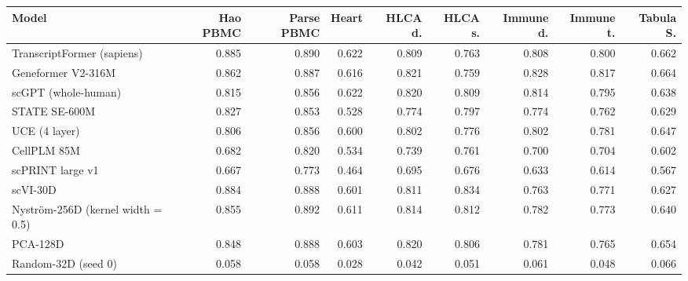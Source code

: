 \begin{tabular}{@{}lrrrrrrrr@{}}
\toprule
Model & Hao PBMC & Parse PBMC & Heart & HLCA d. & HLCA s. & Immune d. & Immune t. & Tabula S. \\
\midrule
TranscriptFormer (sapiens) & 0.885 & 0.890 & 0.622 & 0.809 & 0.763 & 0.808 & 0.800 & 0.662 \\
Geneformer V2-316M & 0.862 & 0.887 & 0.616 & 0.821 & 0.759 & 0.828 & 0.817 & 0.664 \\
scGPT (whole-human) & 0.815 & 0.856 & 0.622 & 0.820 & 0.809 & 0.814 & 0.795 & 0.638 \\
STATE SE-600M & 0.827 & 0.853 & 0.528 & 0.774 & 0.797 & 0.774 & 0.762 & 0.629 \\
UCE (4 layer) & 0.806 & 0.856 & 0.600 & 0.802 & 0.776 & 0.802 & 0.781 & 0.647 \\
CellPLM 85M & 0.682 & 0.820 & 0.534 & 0.739 & 0.761 & 0.700 & 0.704 & 0.602 \\
scPRINT large v1 & 0.667 & 0.773 & 0.464 & 0.695 & 0.676 & 0.633 & 0.614 & 0.567 \\
\midrule
scVI-30D & 0.884 & 0.888 & 0.601 & 0.811 & 0.834 & 0.763 & 0.771 & 0.627 \\
Nyström-256D (kernel width = 0.5) & 0.855 & 0.892 & 0.611 & 0.814 & 0.812 & 0.782 & 0.773 & 0.640 \\
PCA-128D & 0.848 & 0.888 & 0.603 & 0.820 & 0.806 & 0.781 & 0.765 & 0.654 \\
Random-32D (seed 0) & 0.058 & 0.058 & 0.028 & 0.042 & 0.051 & 0.061 & 0.048 & 0.066 \\
\bottomrule
\end{tabular}
